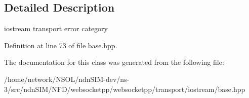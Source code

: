 \subsection{Detailed Description}
iostream transport error category 

Definition at line 73 of file base.\+hpp.



The documentation for this class was generated from the following file\+:\begin{DoxyCompactItemize}
\item 
/home/network/\+N\+S\+O\+L/ndn\+S\+I\+M-\/dev/ns-\/3/src/ndn\+S\+I\+M/\+N\+F\+D/websocketpp/websocketpp/transport/iostream/base.\+hpp\end{DoxyCompactItemize}
